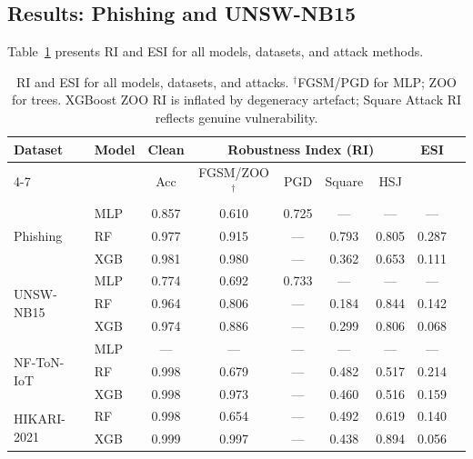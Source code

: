 \documentclass[runningheads]{llncs}
\begin{document}
\subsection{Results: Phishing and UNSW-NB15}

Table~\ref{tab:master} presents RI and ESI for all models, datasets, and attack
methods.

\begin{table}[htbp]
\caption{RI and ESI for all models, datasets, and attacks.
$^\dagger$FGSM/PGD for MLP; ZOO for trees.  XGBoost ZOO RI is inflated by
degeneracy artefact; Square Attack RI reflects genuine vulnerability.}
\label{tab:master}
\centering
\small
\begin{tabular}{llccccccc}
\toprule
\multirow{2}{*}{Dataset} & \multirow{2}{*}{Model} &
  \multirow{2}{*}{Clean} &
  \multicolumn{4}{c}{Robustness Index (RI)} &
  \multirow{2}{*}{ESI} \\
\cmidrule(lr){4-7}
& & Acc & FGSM/ZOO$^\dagger$ & PGD & Square & HSJ & \\
\midrule
\multirow{3}{*}{Phishing}
  & MLP  & 0.857 & 0.610 & 0.725 & ---   & ---   & --- \\
  & RF   & 0.977 & 0.915 & ---   & 0.793 & 0.805 & 0.287 \\
  & XGB  & 0.981 & 0.980 & ---   & 0.362 & 0.653 & 0.111 \\
\midrule
\multirow{3}{*}{UNSW-NB15}
  & MLP  & 0.774 & 0.692 & 0.733 & ---   & ---   & --- \\
  & RF   & 0.964 & 0.806 & ---   & 0.184 & 0.844 & 0.142 \\
  & XGB  & 0.974 & 0.886 & ---   & 0.299 & 0.806 & 0.068 \\
\midrule
\multirow{3}{*}{NF-ToN-IoT}
  & MLP  & ---   & ---   & ---   & ---   & ---   & --- \\
  & RF   & 0.998 & 0.679 & ---   & 0.482 & 0.517 & 0.214 \\
  & XGB  & 0.998 & 0.973 & ---   & 0.460 & 0.516 & 0.159 \\
\midrule
\multirow{2}{*}{HIKARI-2021}
  & RF   & 0.998 & 0.654 & ---   & 0.492 & 0.619 & 0.140 \\
  & XGB  & 0.999 & 0.997 & ---   & 0.438 & 0.894 & 0.056 \\
\bottomrule
\end{tabular}
\end{table}
\end{document}
